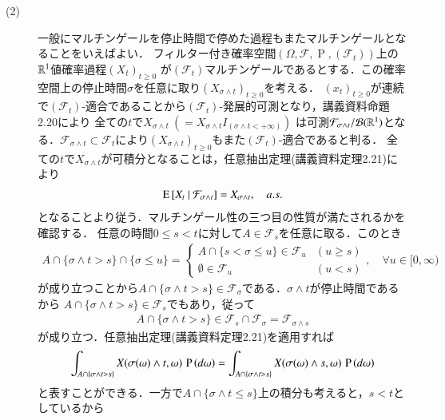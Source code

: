 \begin{prf}
\begin{description}
	\item[(2)] 一般にマルチンゲールを停止時間で停めた過程もまたマルチンゲールとなることをいえばよい．
		フィルター付き確率空間$(\Omega, \mathcal{F}, \operatorname{P}, (\mathcal{F}_t))$上の$\mathbb{R}^1$値確率過程$(X_t)_{t \geq 0}$
		が$(\mathcal{F}_t)$マルチンゲールであるとする．この確率空間上の停止時間$\sigma$を任意に取り$(X_{\sigma \wedge t})_{t \geq 0}$を考える．
		$(x_t)_{t \geq 0}$が連続で$(\mathcal{F}_t)$-適合であることから$(\mathcal{F}_t)$-発展的可測となり，講義資料命題2.20により
		全ての$t$で$X_{\sigma \wedge t}\ \left(= X_{\sigma \wedge t}I_{(\sigma \wedge t < +\infty)}\right)$
		は可測$\mathcal{F}_{\sigma \wedge t}/\mathcal{B}(\mathbb{R}^1)$となる．$\mathcal{F}_{\sigma \wedge t}
		\subset \mathcal{F}_t$により$(X_{\sigma \wedge t})_{t \geq 0}$もまた$(\mathcal{F}_t)$-適合であると判る．
		全ての$t$で$X_{\sigma \wedge t}$が可積分となることは，任意抽出定理(講義資料定理2.21)により
		\begin{align}
			\operatorname{E} \left[ X_t\ |\ \mathcal{F}_{\sigma \wedge t} \right] = X_{\sigma \wedge t}, \quad a.s.
		\end{align}
		となることより従う．マルチンゲール性の三つ目の性質が満たされるかを確認する．
		任意の時間$0 \leq s < t$に対して$A \in \mathcal{F}_s$を任意に取る．このとき
		\begin{align}
			A \cap \{ \sigma \wedge t > s \} \cap \{\sigma \leq u\} = \begin{cases}
				A \cap \{s < \sigma \leq u\} \in \mathcal{F}_u & (u \geq s) \\
				\emptyset \in \mathcal{F}_u & (u < s)
			\end{cases}, \quad \forall u \in [0,\infty)
		\end{align}
		が成り立つことから$A \cap \{ \sigma \wedge t > s \} \in \mathcal{F}_{\sigma}$である．$\sigma \wedge t$が停止時間であるから
		$A \cap \{ \sigma \wedge t > s \} \in \mathcal{F}_s$でもあり，従って
		\begin{align}
			A \cap \{ \sigma \wedge t > s \} \in \mathcal{F}_s \cap \mathcal{F}_{\sigma} = \mathcal{F}_{\sigma \wedge s}
		\end{align}
		が成り立つ．任意抽出定理(講義資料定理2.21)を適用すれば
		\begin{align}
			\int_{A \cap \{ \sigma \wedge t > s \}} X(\sigma(\omega) \wedge t, \omega)\, \operatorname{P} \left(d\omega\right)
			= \int_{A \cap \{ \sigma \wedge t > s \}} X(\sigma(\omega) \wedge s, \omega)\, \operatorname{P} \left(d\omega\right)
		\end{align}
		と表すことができる．一方で$A \cap \{ \sigma \wedge t \leq s \}$上の積分も考えると，$s < t$としているから

\end{description}
\end{prf}
